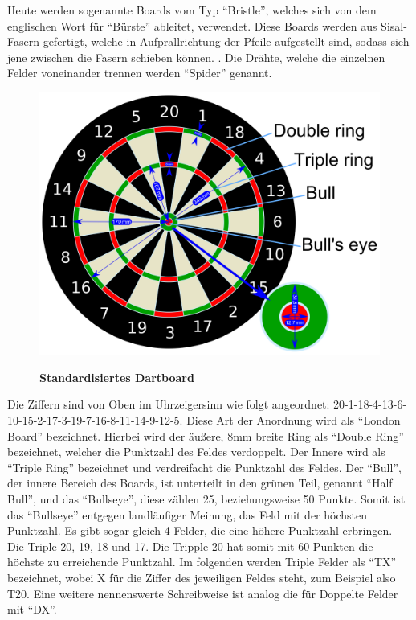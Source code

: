 Heute werden sogenannte Boards vom Typ "`Bristle"', welches sich von dem englischen Wort für "`Bürste"' ableitet, verwendet. Diese Boards werden aus Sisal-Fasern gefertigt, welche in Aufprallrichtung der Pfeile aufgestellt sind, sodass sich jene zwischen die Fasern schieben können. \autocite[6]{dph2015}. Die Drähte, welche die einzelnen Felder voneinander trennen werden "`Spider"' genannt.
\begin{figure}
\includegraphics[width=\textwidth]{media/Dartboard_Abmessungen}\\
\caption{\textbf{Standardisiertes Dartboard\cite{Board2016}}
}
\label{Fig:dartboard}
\end{figure}

Die Ziffern sind von Oben im Uhrzeigersinn wie folgt angeordnet:  20-1-18-4-13-6-10-15-2-17-3-19-7-16-8-11-14-9-12-5. Diese Art der Anordnung wird als "`London Board"' bezeichnet. Hierbei wird der äußere, 8mm breite Ring als "`Double Ring"' bezeichnet, welcher die Punktzahl des Feldes verdoppelt. Der Innere wird als "`Triple Ring"' bezeichnet und verdreifacht die Punktzahl des Feldes. Der "`Bull"', der innere Bereich des Boards, ist unterteilt in den grünen Teil, genannt "`Half Bull"', und das "`Bullseye"', diese zählen 25, beziehungsweise 50 Punkte. 
Somit ist das "`Bullseye"' entgegen landläufiger Meinung, das Feld mit der höchsten Punktzahl. Es gibt sogar gleich 4 Felder, die eine höhere Punktzahl erbringen. Die Triple 20, 19, 18 und 17. Die Tripple 20 hat somit mit 60 Punkten die höchste zu erreichende Punktzahl. Im folgenden werden Triple Felder als "`TX"' bezeichnet, wobei X für die Ziffer des jeweiligen Feldes steht, zum Beispiel also T20. Eine weitere nennenswerte Schreibweise ist analog die für Doppelte Felder mit "`DX"'. 

